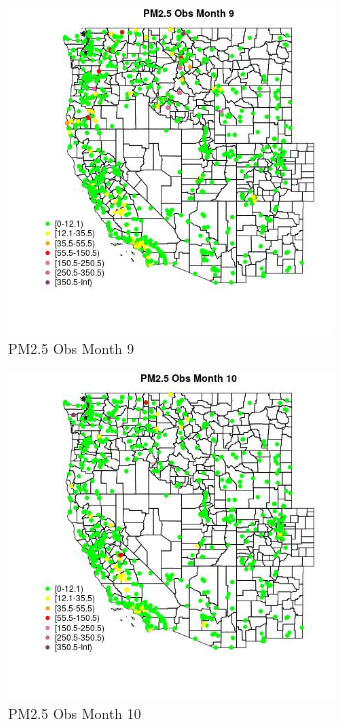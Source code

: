 \begin{figure} 
\centering  
\includegraphics[width=0.77\textwidth]{Code_Outputs/Report_ML_input_PM25_Step4_part_e_de_duplicated_aveswNAs_MapObsMo9PM25_Obs.jpg} 
\caption{\label{fig:Report_ML_input_PM25_Step4_part_e_de_duplicated_aveswNAsMapObsMo9PM25_Obs}PM2.5 Obs Month 9} 
\end{figure} 
 

\clearpage 

\begin{figure} 
\centering  
\includegraphics[width=0.77\textwidth]{Code_Outputs/Report_ML_input_PM25_Step4_part_e_de_duplicated_aveswNAs_MapObsMo10PM25_Obs.jpg} 
\caption{\label{fig:Report_ML_input_PM25_Step4_part_e_de_duplicated_aveswNAsMapObsMo10PM25_Obs}PM2.5 Obs Month 10} 
\end{figure} 
 

